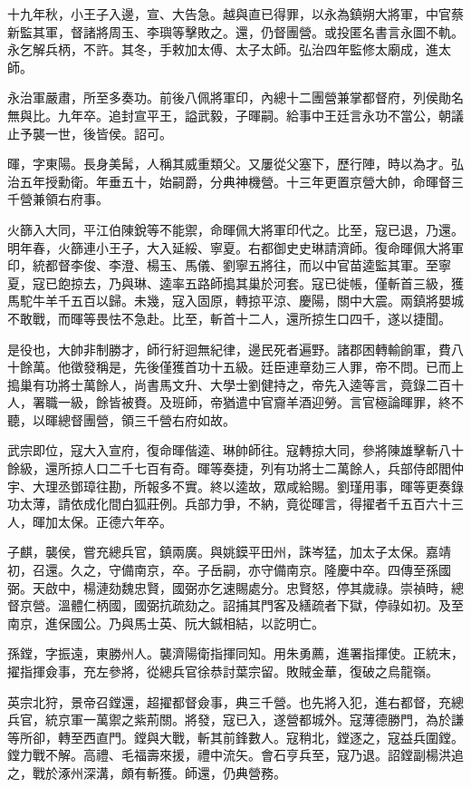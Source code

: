 \begin{pinyinscope}
十九年秋，小王子入邊，宣、大告急。越與直已得罪，以永為鎮朔大將軍，中官蔡新監其軍，督諸將周玉、李璵等擊敗之。還，仍督團營。或投匿名書言永圖不軌。永乞解兵柄，不許。其冬，手敕加太傅、太子太師。弘治四年監修太廟成，進太師。

永治軍嚴肅，所至多奏功。前後八佩將軍印，內總十二團營兼掌都督府，列侯勛名無與比。九年卒。追封宣平王，謚武毅，子暉嗣。給事中王廷言永功不當公，朝議止予襲一世，後皆侯。詔可。

暉，字東陽。長身美髯，人稱其威重類父。又屢從父塞下，歷行陣，時以為才。弘治五年授勳衛。年垂五十，始嗣爵，分典神機營。十三年更置京營大帥，命暉督三千營兼領右府事。

火篩入大同，平江伯陳銳等不能禦，命暉佩大將軍印代之。比至，寇已退，乃還。明年春，火篩連小王子，大入延綏、寧夏。右都御史史琳請濟師。復命暉佩大將軍印，統都督李俊、李澄、楊玉、馬儀、劉寧五將往，而以中官苗逵監其軍。至寧夏，寇已飽掠去，乃與琳、逵率五路師搗其巢於河套。寇已徙帳，僅斬首三級，獲馬駝牛羊千五百以歸。未幾，寇入固原，轉掠平涼、慶陽，關中大震。兩鎮將嬰城不敢戰，而暉等畏怯不急赴。比至，斬首十二人，還所掠生口四千，遂以捷聞。

是役也，大帥非制勝才，師行紆迴無紀律，邊民死者遍野。諸郡困轉輸餉軍，費八十餘萬。他徵發稱是，先後僅獲首功十五級。廷臣連章劾三人罪，帝不問。已而上搗巢有功將士萬餘人，尚書馬文升、大學士劉健持之，帝先入逵等言，竟錄二百十人，署職一級，餘皆被賚。及班師，帝猶遣中官齎羊酒迎勞。言官極論暉罪，終不聽，以暉總督團營，領三千營右府如故。

武宗即位，寇大入宣府，復命暉偕逵、琳帥師往。寇轉掠大同，參將陳雄擊斬八十餘級，還所掠人口二千七百有奇。暉等奏捷，列有功將士二萬餘人，兵部侍郎閻仲宇、大理丞鄧璋往勘，所報多不實。終以逵故，眾咸給賜。劉瑾用事，暉等更奏錄功太薄，請依成化間白狐莊例。兵部力爭，不納，竟從暉言，得擢者千五百六十三人，暉加太保。正德六年卒。

子麒，襲侯，嘗充總兵官，鎮兩廣。與姚鏌平田州，誅岑猛，加太子太保。嘉靖初，召還。久之，守備南京，卒。子岳嗣，亦守備南京。隆慶中卒。四傳至孫國弼。天啟中，楊漣劾魏忠賢，國弼亦乞速賜處分。忠賢怒，停其歲祿。崇禎時，總督京營。溫體仁柄國，國弼抗疏劾之。詔捕其門客及繕疏者下獄，停祿如初。及至南京，進保國公。乃與馬士英、阮大鋮相結，以訖明亡。

孫鏜，字振遠，東勝州人。襲濟陽衛指揮同知。用朱勇薦，進署指揮使。正統末，擢指揮僉事，充左參將，從總兵官徐恭討葉宗留。敗賊金華，復破之烏龍嶺。

英宗北狩，景帝召鏜還，超擢都督僉事，典三千營。也先將入犯，進右都督，充總兵官，統京軍一萬禦之紫荊關。將發，寇已入，遂營都城外。寇薄德勝門，為於謙等所卻，轉至西直門。鏜與大戰，斬其前鋒數人。寇稍北，鏜逐之，寇益兵圍鏜。鏜力戰不解。高禮、毛福壽來援，禮中流矢。會石亨兵至，寇乃退。詔鏜副楊洪追之，戰於涿州深溝，頗有斬獲。師還，仍典營務。


\end{pinyinscope}
